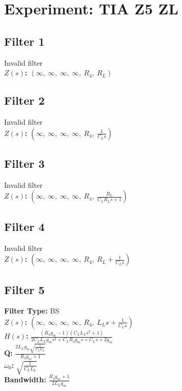 \documentclass{article}
\begin{document}
        \section*{Experiment: TIA Z5 ZL}
\subsection*{Filter 1}
Invalid filter \\ 
\textbf{$Z(s)$:} $\left( \infty, \  \infty, \  \infty, \  \infty, \  R_{4}, \  R_{L}\right)$ \\ 
\subsection*{Filter 2}
Invalid filter \\ 
\textbf{$Z(s)$:} $\left( \infty, \  \infty, \  \infty, \  \infty, \  R_{4}, \  \frac{1}{C_{L} s}\right)$ \\ 
\subsection*{Filter 3}
Invalid filter \\ 
\textbf{$Z(s)$:} $\left( \infty, \  \infty, \  \infty, \  \infty, \  R_{4}, \  \frac{R_{L}}{C_{L} R_{L} s + 1}\right)$ \\ 
\subsection*{Filter 4}
Invalid filter \\ 
\textbf{$Z(s)$:} $\left( \infty, \  \infty, \  \infty, \  \infty, \  R_{4}, \  R_{L} + \frac{1}{C_{L} s}\right)$ \\ 
\subsection*{Filter 5}
\textbf{Filter Type:} BS \\ 
\textbf{$Z(s)$:} $\left( \infty, \  \infty, \  \infty, \  \infty, \  R_{4}, \  L_{L} s + \frac{1}{C_{L} s}\right)$ \\ 
\textbf{$H(s)$:} $\frac{\left(R_{4} g_{m} - 1\right) \left(C_{L} L_{L} s^{2} + 1\right)}{2 C_{L} L_{L} g_{m} s^{2} + C_{L} R_{4} g_{m} s + C_{L} s + 2 g_{m}}$ \\ 
\textbf{Q:} $\frac{2 L_{L} g_{m} \sqrt{\frac{1}{C_{L} L_{L}}}}{R_{4} g_{m} + 1}$ \\ 
\textbf{$\omega_0$:} $\sqrt{\frac{1}{C_{L} L_{L}}}$ \\ 
\textbf{Bandwidth:} $\frac{R_{4} g_{m} + 1}{2 L_{L} g_{m}}$ \\ 
\end{document}
